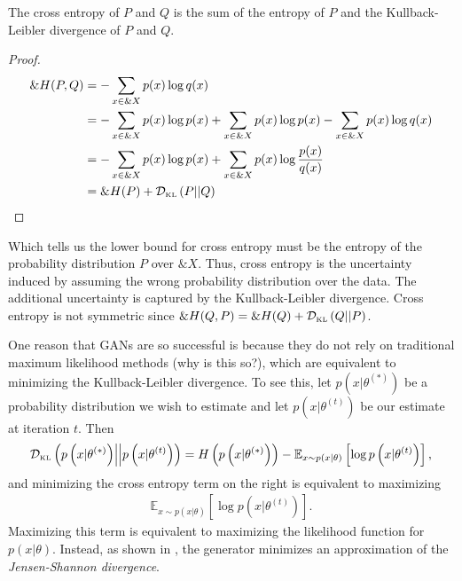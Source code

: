 \begin{lemma}
The cross entropy of $P$ and $Q$ is the sum of the entropy of $P$ and the
Kullback-Leibler divergence of $P$ and $Q$.
\end{lemma}
\begin{proof}
\begin{align}
  \label{eq:cross-entropy-alt}
  \&H(P, Q) & = -\sum_{x \in \&X} p(x) \log q(x) \\
            & = -\sum_{x \in \&X} p(x) \log p(x) + \sum_{x \in \&X} p(x) \log p(x) - \sum_{x \in \&X} p(x) \log q(x) \\
            & = -\sum_{x \in \&X} p(x) \log p(x) + \sum_{x \in \&X} p(x) \log {p(x) \over q(x)} \\
            & = \&H(P) + \mathcal{D}_{\text{\tiny KL}}\left( P \middle| \middle| Q \right)
\end{align}
\end{proof}

Which tells us the lower bound for cross entropy must be the entropy of the
probability distribution $P$ over $\&X$. Thus, cross entropy is the uncertainty
induced by assuming the wrong probability distribution over the data. The
additional uncertainty is captured by the Kullback-Leibler divergence. Cross
entropy is not symmetric since $\&H(Q, P) = \&H(Q) + \mathcal{D}_{\text{\tiny KL}}\left( Q \middle| \middle| P \right)$.

One reason that GANs are so successful is because they do not rely on
traditional maximum likelihood methods (why is this so?), which are equivalent
to minimizing the Kullback-Leibler divergence. To see this, let $p\left(x |
  \theta^{(*)}\right)$ be a probability distribution we wish to estimate and let
$p\left(x | \theta^{\left(t\right)}\right)$ be our estimate at iteration $t$.
Then
\begin{align}
  \label{eq:equivalent-mle}
  \mathcal{D}_{\text{\tiny KL}}\left( p\left(x | \theta^{(*)}\right) \middle| \middle| p\left(x | \theta^{\left(t\right)}\right) \right) =
  H\left(p\left(x | \theta^{(*)}\right)\right) -
  \mathbb{E}_{x \sim p\left(x | \theta\right)}\left[ \log p\left(x | \theta^{\left(t\right)}\right) \right],
 \end{align}
 and minimizing the cross entropy term on the right is equivalent to maximizing
 \begin{align}
   \mathbb{E}_{x \sim p\left(x | \theta\right)}\left[ \log p\left(x | \theta^{\left(t\right)}\right) \right].
 \end{align}
 Maximizing this term is equivalent to maximizing the likelihood function for
 $p\left(x | \theta\right)$. Instead, as shown in
 \cite{ref:goodfellow-original}, the generator minimizes an approximation of the
 \textit{Jensen-Shannon divergence}.

